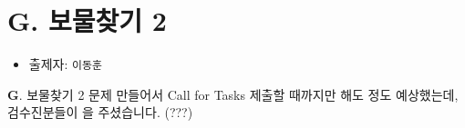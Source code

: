 \section{G. 보물찾기 2}

\begin{frame} %
    \begin{itemize}
        \item 출제자: \texttt{이동훈}
    \end{itemize}
\end{frame}

\begin{frame}{\textbf{G}. 보물찾기 2}
    문제 만들어서 Call for Tasks 제출할 때까지만 해도 정도 예상했는데, 검수진분들이 을 주셨습니다. (???)
\end{frame}
